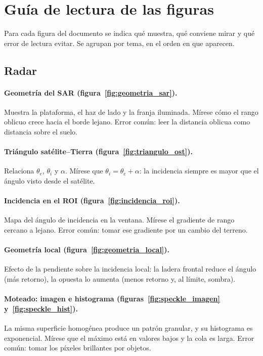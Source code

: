 \documentclass[11pt,a4paper]{article}
\begin{document}
\section{Guía de lectura de las figuras}
\label{sec:guia-figuras}

Para cada figura del documento se indica qué muestra, qué conviene mirar y qué error de lectura evitar. Se
agrupan por tema, en el orden en que aparecen.

\subsection*{Radar}

\paragraph{Geometría del SAR (figura~\ref{fig:geometria_sar}).} Muestra la plataforma, el haz de lado y la
franja iluminada. Mírese cómo el rango oblicuo crece hacia el borde lejano. Error común: leer la distancia
oblicua como distancia sobre el suelo.

\paragraph{Triángulo satélite--Tierra (figura~\ref{fig:triangulo_ost}).} Relaciona $\theta_e$, $\theta_i$ y
$\alpha$. Mírese que $\theta_i=\theta_e+\alpha$: la incidencia siempre es mayor que el ángulo visto desde el satélite.

\paragraph{Incidencia en el ROI (figura~\ref{fig:incidencia_roi}).} Mapa del ángulo de incidencia en la
ventana. Mírese el gradiente de rango cercano a lejano. Error común: tomar ese gradiente por un cambio del
terreno.

\paragraph{Geometría local (figura~\ref{fig:geometria_local}).} Efecto de la pendiente sobre la incidencia
local: la ladera frontal reduce el ángulo (más retorno), la opuesta lo aumenta (menos retorno y, al límite,
sombra).

\paragraph{Moteado: imagen e histograma (figuras~\ref{fig:speckle_imagen} y~\ref{fig:speckle_hist}).} La misma
superficie homogénea produce un patrón granular, y su histograma es exponencial. Mírese que el máximo está en
valores bajos y la cola es larga. Error común: tomar los píxeles brillantes por objetos.
\end{document}
